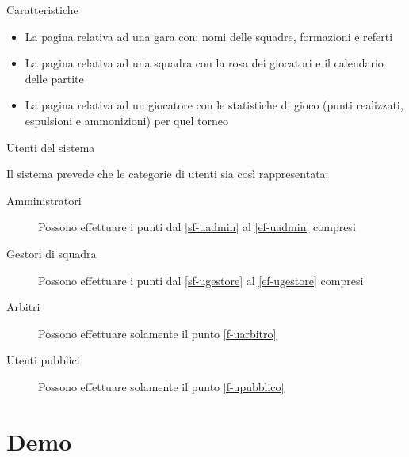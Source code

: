 \documentclass[10pt]{beamer}
\begin{document}
\begin{frame}[allowframebreaks]{Caratteristiche}
\begin{enumerate}
	\begin{itemize}
		\item 
		La pagina relativa ad una gara con: nomi delle squadre, formazioni e referti
		
		\item
		La pagina relativa ad una squadra con la rosa dei giocatori e il calendario delle partite
		
		\item
		La pagina relativa ad un giocatore con le statistiche di gioco (punti realizzati, espulsioni e ammonizioni) per quel torneo
	\end{itemize}

\end{enumerate}
\end{frame}

\begin{frame}{Utenti del sistema}

Il sistema prevede che le categorie di utenti sia così rappresentata:

\begin{description}
	
	\item[Amministratori] Possono effettuare i punti dal \ref{sf-uadmin} al \ref{ef-uadmin} compresi
	
	\item[Gestori di squadra] Possono effettuare i punti dal \ref{sf-ugestore} al \ref{ef-ugestore} compresi
	
	\item[Arbitri] Possono effettuare solamente il punto \ref{f-uarbitro}
	
	\item[Utenti pubblici] Possono effettuare solamente il punto \ref{f-upubblico}
	
\end{description}
\end{frame}

\section{Demo}
\end{document}
